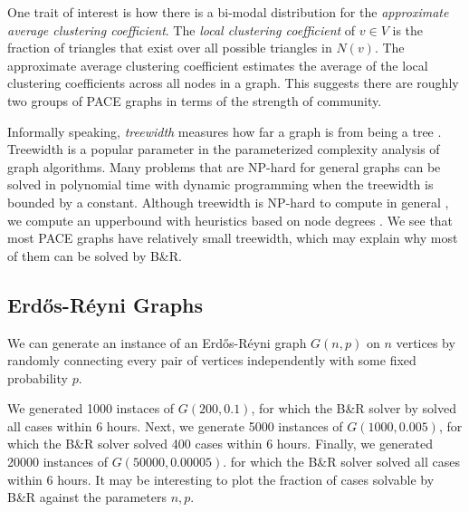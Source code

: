 \documentclass{article}
\begin{document}
One trait of interest is how there is a bi-modal distribution for the \emph{approximate average clustering coefficient}.
The \emph{local clustering coefficient} of $v\in V$
is the fraction of triangles that exist over all possible triangles in $N(v)$.
The approximate average clustering coefficient
estimates the average of the local clustering coefficients across all nodes in a graph.
This suggests there are roughly two groups of PACE graphs in terms of the strength of community.

Informally speaking, \emph{treewidth} measures how far a graph is from being a tree \citet{robertson1986graph}.
Treewidth is a popular parameter in the parameterized complexity analysis of graph algorithms.
Many problems that are NP-hard for general graphs can be solved in polynomial time
with dynamic programming
when the treewidth is bounded by a constant.
Although treewidth is NP-hard to compute in general \citet{treewidth_hardness},
we compute an upperbound with heuristics based on node degrees \citet{bodlaender2010treewidth}.
We see that most PACE graphs have relatively small treewidth,
which may explain why most of them can be solved by B\&R.

\subsection{Erd\H os-R\'eyni Graphs}
We can generate an instance of an Erd\H os-R\'eyni graph $G(n, p)$ on $n$ vertices
by randomly connecting every pair of vertices independently
with some fixed probability $p$.

We generated 1000 instaces of $G(200, 0.1)$,
for which the B\&R solver by \citet{kamis} solved all cases within 6 hours.
Next, we generate 5000 instances of $G(1000, 0.005)$,
for which the B\&R solver solved 400 cases within 6 hours.
Finally, we generated 20000 instances of $G(50000, 0.00005)$.
for which the B\&R solver solved all cases within 6 hours.
It may be interesting to plot the fraction of cases solvable by B\&R
against the parameters $n, p$.
\end{document}
